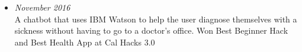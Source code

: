 \documentclass[letterpaper,8pt]{article}
\begin{document}
{\begin{itemize}
\item{\small{\textbf{\href{https://devpost.com/software/bearmax}{}}}\hfill{\textit{November 2016}} \\
	\small{A chatbot that uses IBM Watson to help the user diagnose themselves with a sickness without having to go to a doctor's office. Won Best Beginner Hack and Best Health App at Cal Hacks 3.0}}





\end{itemize}



\vspace{0.02in}

}
\end{document}
